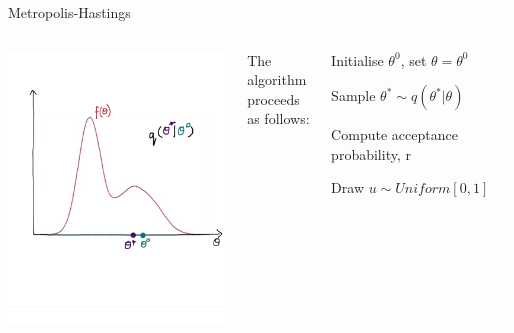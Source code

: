 \documentclass[compress]{beamer}
\begin{document}
\begin{frame}[label=sec-7-11]{Metropolis-Hastings}
\begin{columns}[c] 
\includegraphics[width=1\linewidth]{MH2}

The algorithm proceeds as follows:\\
\begin{enumerate}
\item Initialise $\theta^{0}$, set $\theta = \theta^{0}$
\item Sample $\theta^* \sim q(\theta^*|\theta)$
\item Compute acceptance probability, r
\item Draw $u \sim Uniform[0,1]$
\textcolor{white}{
\item[\color{white}] Set new sample to 
\[
 \theta^{(s+1)} = 
\begin{cases}
    \theta^*, & \text{if } u < r\\
    \theta^{(s)}, & \text{if } u \geqslant r
\end{cases}
\]
\item[\color{white}] Repeat steps 2-5
}
\end{enumerate}
\end{columns}
\end{frame}
\end{document}
